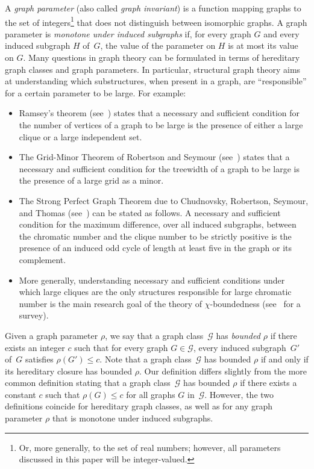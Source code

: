 \documentclass[11pt]{article}
\theoremstyle{plain}
\theoremstyle{definition}
\theoremstyle{remark}
\numberwithin{equation}{section}
\begin{document}
A \emph{graph parameter} (also called \emph{graph invariant}) is a function mapping graphs to the set of integers\footnote{Or, more generally, to the set of real numbers; however, all parameters discussed in this paper will be integer-valued.} that does not distinguish between isomorphic graphs.
A graph parameter is \emph{monotone under induced subgraphs} if, for every graph $G$ and every induced subgraph $H$ of~$G$, the value of the parameter on $H$ is at most its value on $G$.
Many questions in graph theory can be formulated in terms of hereditary graph classes and graph parameters.
In particular, structural graph theory aims at understanding which substructures, when present in a graph, are ``responsible'' for a certain parameter to be large.
For example:
\begin{itemize}
\item Ramsey's theorem (see~\cite{MR1576401}) states that a necessary and sufficient condition for the number of vertices of a graph to be large is the presence of either a large clique or a large independent set.
\item The Grid-Minor Theorem of Robertson and Seymour (see~\cite{MR0854606}) states that a necessary and sufficient condition for the treewidth of a graph to be large is the presence of a large grid as a minor.
\item The Strong Perfect Graph Theorem due to Chudnovsky, Robertson, Seymour, and Thomas (see~\cite{MR2233847}) can be stated as follows.
A necessary and sufficient condition for the maximum difference, over all induced subgraphs, between the chromatic number and the clique number to be strictly positive is the presence of an induced odd cycle of length at least five in the graph or its complement.

\item More generally, understanding necessary and sufficient conditions under which large cliques are the only structures responsible for large chromatic number is the main research goal of the theory of $\chi$-boundedness (see~\cite{MR4174126} for a survey).
\end{itemize}

\medskip
{} 
Given a graph parameter $\rho$, we say that a graph class~$\mathcal{G}$ has \emph{bounded $\rho$} if there exists an integer $c$ such that for every graph $G \in \mathcal{G}$, every induced subgraph~$G'$ of~$G$ satisfies $\rho(G')\le c$.
Note that a graph class~$\mathcal{G}$ has bounded $\rho$ if and only if its hereditary closure has bounded $\rho$.
Our definition differs slightly from the more common definition stating that a graph class~$\mathcal{G}$ has bounded $\rho$ if there exists a constant $c$ such that $\rho(G)\le c$ for all graphs $G$ in~$\mathcal{G}$.
However, the two definitions coincide for hereditary graph classes, as well as for any graph parameter $\rho$ that is monotone under induced subgraphs.
\end{document}
